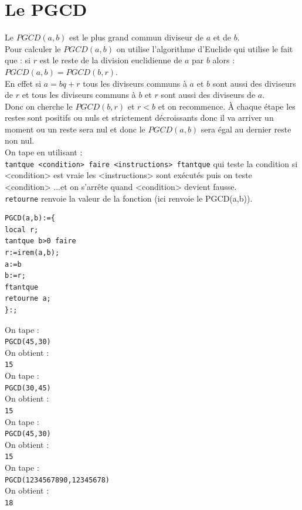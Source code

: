 \documentclass[a4paper,11pt]{book}
\begin{document}
\section{Le PGCD}
Le $PGCD(a,b)$ est le plus grand commun diviseur de $a$ et de $b$.\\
Pour calculer le $PGCD(a,b)$ on utilise l'algorithme d'Euclide qui utilise le 
fait que :
si $r$ est le reste de la division euclidienne de $a$ par $b$ alors :\\
$PGCD(a,b)=PGCD(b,r)$.\\
En effet si $a=bq+r$ tous les diviseurs communs \`a $a$ et $b$ sont aussi des 
diviseurs de $r$ et tous les diviseurs communs \`a $b$ et $r$ sont aussi des 
diviseurs de $a$.\\
Donc on cherche le $PGCD(b,r)$ et $r<b$ et on recommence. \`A chaque \'etape 
les restes sont positifs ou nuls et strictement d\'ecroissants donc il va 
arriver un moment ou un reste sera nul et donc le $PGCD(a,b)$ sera \'egal au 
dernier reste non nul.\\
On tape en utilisant :\\
{\tt tantque <condition> faire <instructions> ftantque} qui teste la condition
si <condition> est vraie les <instructions> sont ex\'ecut\'es puis on teste  
<condition> ...et on s'arr\^ete quand <condition> devient fausse.\\
{\tt retourne} renvoie la valeur de la fonction (ici renvoie le PGCD(a,b)).
\begin{verbatim}
PGCD(a,b):={
local r;
tantque b>0 faire 
r:=irem(a,b);
a:=b
b:=r;
ftantque
retourne a;
}:;
\end{verbatim}
On tape :\\
{\tt PGCD(45,30)}\\
On obtient :\\
{\tt 15}\\
On tape :\\
{\tt PGCD(30,45)}\\
On obtient :\\
{\tt 15}\\
On tape :\\
{\tt PGCD(45,30)}\\
On obtient :\\
{\tt 15}\\
On tape :\\
{\tt PGCD(1234567890,12345678)}\\
On obtient :\\
{\tt 18}\\
\end{document}
